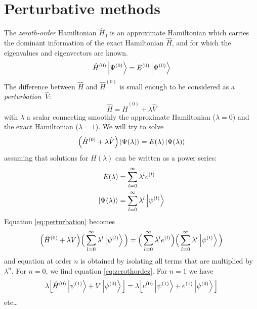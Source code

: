 \documentclass[./thesis.tex]{subfiles}
\begin{document}
\section{Perturbative methods}


The \emph{zeroth-order} Hamiltonian $\hat{H}_0$ is an approximate Hamiltonian which
carries the dominant information of the exact Hamiltonian $\hat{H}$, and for which
the eigenvalues and eigenvectors are known.
\begin{equation}
\label{eq:zerothordez}
\hat{H}^{(0)} \ket {\Psi^{(0)}} = E^{(0)} \ket{\Psi^{(0)}}
\end{equation}
The difference between $\hat{H}$ and
$\hat{H}^{(0)}$ is small enough to be considered as a \emph{perturbation}~$\hat{V}$:
\begin{equation}
\hat{H} = \hat{H}^{(0)} + \lambda \hat{V}
\end{equation}
with $\lambda$ a scalar connecting smoothly the approximate Hamiltonian ($\lambda=0$) and the exact Hamiltonian ($\lambda=1$). We will try to solve
\begin{equation}
\label{eq:perturbation}
\qty(\hat{H}^{(0)} + \lambda \hat{V}) \ket {\Psi (\lambda)} = E(\lambda)\ket {\Psi (\lambda)}
\end{equation}
assuming that solutions for $H(\lambda)$ can be written as a power series:
\begin{align}
E(\lambda) & = \sum_{l=0}^{\infty} \lambda^l e^{(l)}  \\
\ket {\Psi (\lambda)} & = \sum_{l=0}^{\infty} \lambda^l \ket {\psi^{(l)}} 
\end{align}
Equation \ref{eq:perturbation} becomes
\begin{equation}
\qty(\hat{H}^{(0)} + \lambda V) \Big ( \sum_{l=0}^{\infty} \lambda^l \ket {\psi^{(l)}} \Big )  = \Big ( \sum_{l=0}^{\infty} \lambda^l e^{(l)} \Big ) \Big ( \sum_{l=0}^{\infty} \lambda^l \ket {\psi^{(l)}} \Big )
\end{equation}
and equation at order $n$ is obtained by isolating all terms that are multiplied by $\lambda^n$. For $n=0$, we find equation \ref{eq:zerothordez}. For $n=1$ we have
\begin{equation}
\lambda \Big [ \hat{H}^{(0)} \ket {\psi^{(1)}} + V \ket {\psi^{(0)}} \Big ] = \lambda \Big [ e^{(0)} \ket {\psi^{(1)}} + e^{(1)} \ket {\psi^{(0)}} \Big ]
\end{equation}
etc\dots
\end{document}
